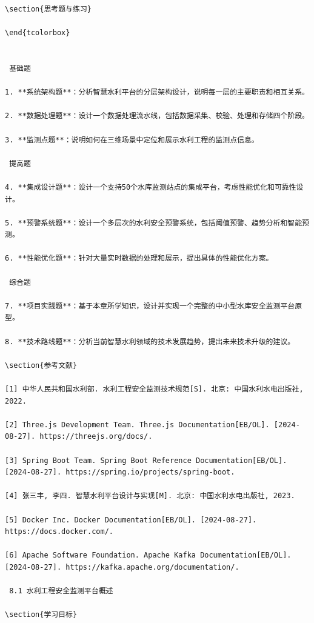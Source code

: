\begin{lstlisting}
\section{思考题与练习}

\end{tcolorbox}


 基础题

1. **系统架构题**：分析智慧水利平台的分层架构设计，说明每一层的主要职责和相互关系。

2. **数据处理题**：设计一个数据处理流水线，包括数据采集、校验、处理和存储四个阶段。

3. **监测点题**：说明如何在三维场景中定位和展示水利工程的监测点信息。

 提高题

4. **集成设计题**：设计一个支持50个水库监测站点的集成平台，考虑性能优化和可靠性设计。

5. **预警系统题**：设计一个多层次的水利安全预警系统，包括阈值预警、趋势分析和智能预测。

6. **性能优化题**：针对大量实时数据的处理和展示，提出具体的性能优化方案。

 综合题

7. **项目实践题**：基于本章所学知识，设计并实现一个完整的中小型水库安全监测平台原型。

8. **技术路线题**：分析当前智慧水利领域的技术发展趋势，提出未来技术升级的建议。

\section{参考文献}

[1] 中华人民共和国水利部. 水利工程安全监测技术规范[S]. 北京: 中国水利水电出版社, 2022.

[2] Three.js Development Team. Three.js Documentation[EB/OL]. [2024-08-27]. https://threejs.org/docs/.

[3] Spring Boot Team. Spring Boot Reference Documentation[EB/OL]. [2024-08-27]. https://spring.io/projects/spring-boot.

[4] 张三丰, 李四. 智慧水利平台设计与实现[M]. 北京: 中国水利水电出版社, 2023.

[5] Docker Inc. Docker Documentation[EB/OL]. [2024-08-27]. https://docs.docker.com/.

[6] Apache Software Foundation. Apache Kafka Documentation[EB/OL]. [2024-08-27]. https://kafka.apache.org/documentation/.

 8.1 水利工程安全监测平台概述

\section{学习目标}


\end{lstlisting}
